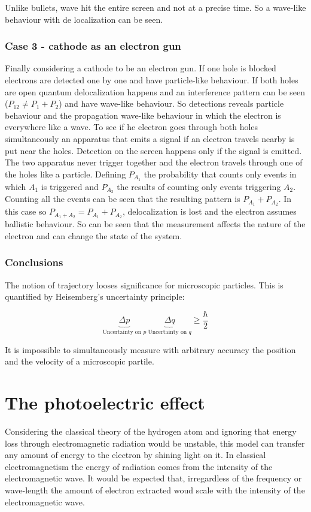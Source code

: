     Unlike bullets, wave hit the entire screen and not at a precise time.
    So a wave-like behaviour with de localization can be seen.

    \subsubsection{Case 3 - cathode as an electron gun}
    Finally considering a cathode to be an electron gun.
    If one hole is blocked electrons are detected one by one and have particle-like behaviour.
    If both holes are open quantum delocalization happens and an interference pattern can be seen ($P_{12} \neq P_1 + P_2$) and have wave-like behaviour.
    So detections reveals particle behaviour and the propagation wave-like behaviour in which the electron is everywhere like a wave.
    To see if he electron goes through both holes simultaneously an apparatus that emits a signal if an electron travels nearby is put near the holes.
    Detection on the screen happens only if the signal is emitted.
    The two apparatus never trigger together and the electron travels through one of the holes like a particle.
    Defining $P_{A_1}$ the probability that counts only events in which $A_1$ is triggered and $P_{A_2}$ the results of counting only events triggering $A_2$.
    Counting all the events can be seen that the resulting pattern is $P_{A_1}+P_{A_2}$.
    In this case so $P_{A_1+A_2} = P_{A_1} + P_{A_2}$, delocalization is lost and the electron assumes ballistic behaviour.
    So can be seen that the measurement affects the nature of the electron and can change the state of the system.

    \subsubsection{Conclusions}
    The notion of trajectory looses significance for microscopic particles.
    This is quantified by Heisemberg's uncertainty principle:

    $$\underbrace{\Delta p}_{\text{Uncertainty on }p}\ \underbrace{\Delta q }_{\text{Uncertainty on }q} \ge \frac{\hbar}{2}$$

    It is impossible to simultaneously measure with arbitrary accuracy the position and the velocity of a microscopic partile.

\section{The photoelectric effect}
Considering the classical theory of the hydrogen atom and ignoring that energy loss through electromagnetic radiation would be unstable, this model can transfer any amount of energy to the electron by shining light on it.
In classical electromagnetism the energy of radiation comes from the intensity of the electromagnetic wave.
It would be expected that, irregardless of the frequency or wave-length the amount of electron extracted woud scale with the intensity of the electromagnetic wave.

